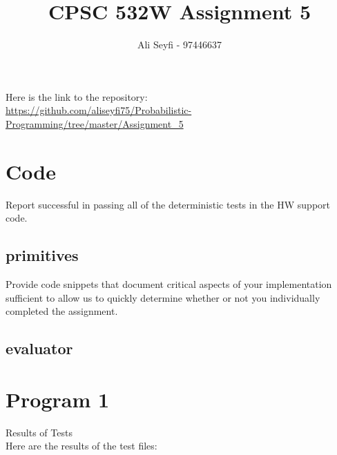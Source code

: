 \documentclass{article}
\def\blu#1{{\color{blu}#1}}
\begin{document}
\title{\vspace{-20mm}
CPSC 532W Assignment 5}
\author{Ali Seyfi - 97446637}
\date{}
\maketitle

Here is the link to the repository:\\
\url{https://github.com/aliseyfi75/Probabilistic-Programming/tree/master/Assignment_5}

\section{Code}
\blu{Report successful in passing all of the deterministic tests in the HW support code.}

\subsection{primitives}
\blu{Provide code snippets that document critical aspects of your implementation sufficient to allow us to quickly determine whether or not you individually completed the assignment.}





\subsection{evaluator}





\pagebreak
\section{Program 1}
\blu{Results of Tests}\\
Here are the results of the test files:\\
\end{document}
